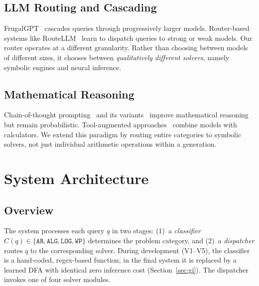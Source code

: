 \documentclass[journal]{IEEEtai}
\begin{document}
\subsection{LLM Routing and Cascading}
FrugalGPT~\cite{chen2023frugalgpt} cascades queries through progressively larger models. Router-based systems like RouteLLM~\cite{ong2024routellm} learn to dispatch queries to strong or weak models. Our router operates at a different granularity. Rather than choosing between models of different sizes, it chooses between \textit{qualitatively different solvers}, namely symbolic engines and neural inference.

\subsection{Mathematical Reasoning}
Chain-of-thought prompting~\cite{wei2022cot} and its variants~\cite{wang2023selfconsistency} improve mathematical reasoning but remain probabilistic. Tool-augmented approaches~\cite{cobbe2021gsm8k} combine models with calculators. We extend this paradigm by routing entire categories to symbolic solvers, not just individual arithmetic operations within a generation.


\section{System Architecture}
\label{sec:architecture}

\subsection{Overview}

The system processes each query $q$ in two stages: (1)~a \textit{classifier} $C(q) \in \{\texttt{AR}, \texttt{ALG}, \texttt{LOG}, \texttt{WP}\}$ determines the problem category, and (2)~a \textit{dispatcher} routes $q$ to the corresponding solver. During development (V1--V5), the classifier is a hand-coded, regex-based function; in the final system it is replaced by a learned DFA with identical zero inference cost (Section~\ref{sec:gi}). The dispatcher invokes one of four solver modules.
\end{document}
